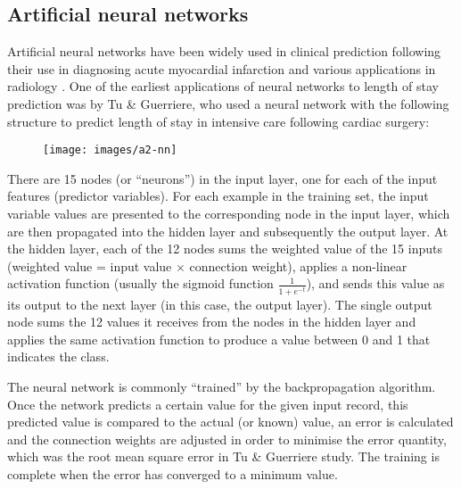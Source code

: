 \subsection{Artificial neural networks}
Artificial neural networks have been widely used in clinical prediction
following their use in diagnosing acute myocardial infarction and various
applications in radiology \citep{Baxt1995}.
One of the earliest applications of neural networks to
length of stay prediction was by Tu \& Guerriere, who used a neural network
with the following structure \citep{Tu1993} to predict length of stay in
intensive care following cardiac surgery:
\begin{figure}[h]
\caption{}
\centering
\texttt{[image: images/a2-nn]}
\end{figure}

There are 15 nodes (or ``neurons'') in the input layer, one for each of the
input features (predictor variables). For each example in the training set,
the input variable values are presented to the corresponding node in the input
layer, which are then propagated into the hidden layer and subsequently the
output layer. At the hidden layer, each of the 12 nodes sums the weighted
value of the 15 inputs (weighted value = input value $\times$ connection
weight), applies a non-linear activation function (usually the sigmoid function
$\frac{1}{1+e^{-t}}$), and sends this value as its output to the next layer
(in this case, the output layer). The single output node sums the 12 values
it receives from the nodes in the hidden layer and applies the same activation
function to produce a value between 0 and 1 that indicates the class.

The neural network is commonly ``trained'' by the backpropagation algorithm.
Once the network predicts a certain value for the given input record, this
predicted value is compared to the actual (or known) value, an error is
calculated and the connection weights are adjusted in order to minimise the
error quantity, which was the root mean square error in Tu \& Guerriere study.
The training is complete when the error has converged to a minimum value.

